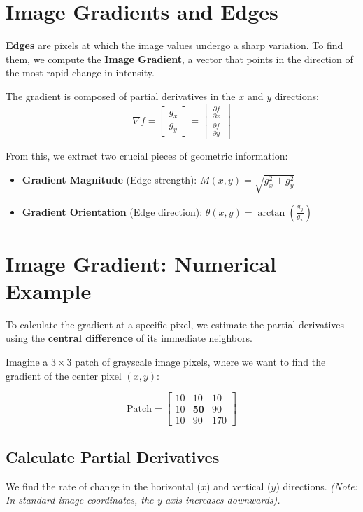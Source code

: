 \documentclass{report}
\begin{document}
\section{Image Gradients and Edges}
\textbf{Edges} are pixels at which the image values undergo a sharp variation. To find them, we compute the \textbf{Image Gradient}, a vector that points in the direction of the most rapid change in intensity.

The gradient is composed of partial derivatives in the $x$ and $y$ directions:
\[ \nabla f = \begin{bmatrix} g_x \\ g_y \end{bmatrix} = \begin{bmatrix} \frac{\partial f}{\partial x} \\ \frac{\partial f}{\partial y} \end{bmatrix} \]

From this, we extract two crucial pieces of geometric information:
\begin{itemize}
    \item \textbf{Gradient Magnitude} (Edge strength): $M(x,y) = \sqrt{g_x^2 + g_y^2}$
    \item \textbf{Gradient Orientation} (Edge direction): $\theta(x,y) = \arctan\left(\frac{g_y}{g_x}\right)$
\end{itemize}

\section{Image Gradient: Numerical Example}

To calculate the gradient at a specific pixel, we estimate the partial derivatives using the \textbf{central difference} of its immediate neighbors.

Imagine a $3 \times 3$ patch of grayscale image pixels, where we want to find the gradient of the center pixel $(x,y)$:

\[ \text{Patch} = \begin{bmatrix} 10 & 10 & 10 \\ 10 & \textbf{50} & 90 \\ 10 & 90 & 170 \end{bmatrix} \]

\subsection{Calculate Partial Derivatives}
We find the rate of change in the horizontal ($x$) and vertical ($y$) directions. \textit{(Note: In standard image coordinates, the y-axis increases downwards).}
\end{document}
